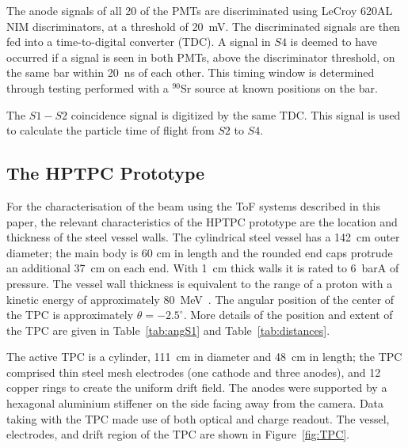 The anode signals of all 20 of the PMTs are discriminated using LeCroy 620AL NIM discriminators, at a threshold of 20~mV.
The discriminated signals are then fed into a time-to-digital converter (TDC). A signal in $\mathit{S4}$ is deemed to have occurred if a signal is seen in both PMTs, above the discriminator threshold, on the same bar within 20~ns of each other. 
This timing window is determined through testing performed with a $^{90}$Sr source at known positions on the bar.

The $\mathit{S1-S2}$ coincidence signal is digitized by the same TDC. This signal is used to calculate the particle time of flight from $\mathit{S2}$ to $\mathit{S4}$.

\subsection{The HPTPC Prototype}
For the characterisation of the beam using the ToF systems described in this paper, the relevant characteristics of the HPTPC prototype are the location and thickness of the steel vessel walls.
The cylindrical steel vessel has a 142~cm outer diameter; the main body is 60 cm in length and the rounded end caps protrude an additional 37~cm on each end.
With 1~cm thick walls it is rated to 6~barA of pressure.
The vessel wall thickness is equivalent to the range of a proton with a kinetic energy of approximately 80~MeV~\cite{rangeTables}.
The angular position of the center of the TPC is approximately $\theta = -2.5^{\circ}$. 
More details of the position and extent of the TPC are given in Table~\ref{tab:angS1} and Table~\ref{tab:distances}.
 
The active TPC is a cylinder, 111~cm in diameter and 48~cm in length; the TPC comprised thin steel mesh electrodes (one cathode and three anodes), and 12 copper rings to create the uniform drift field. The anodes were supported by a hexagonal aluminium stiffener on the side facing away from the camera.
Data taking with the TPC made use of both optical and charge readout.
The vessel, electrodes, and drift region of the TPC are shown in Figure~\ref{fig:TPC}.

